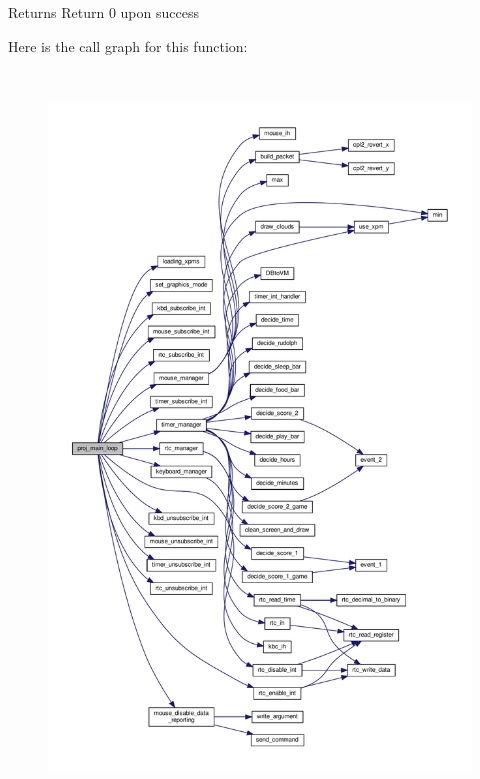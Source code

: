 \begin{DoxyReturn}{Returns}
Return 0 upon success 
\end{DoxyReturn}
Here is the call graph for this function\+:\nopagebreak
\begin{figure}[H]
\begin{center}
\leavevmode
\includegraphics[height=550pt]{group__main__loop_ga2a16f651eccbd248e1ad3b3b924b143b_cgraph}
\end{center}
\end{figure}
